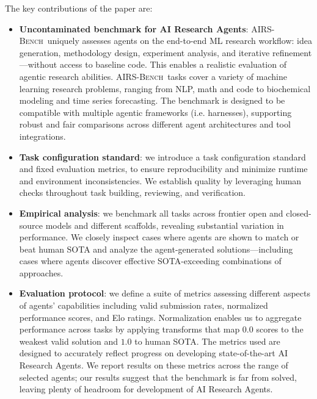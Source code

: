 \documentclass{fairmeta}
\newcommand{\airsbench}{\textsc{AIRS-Bench}}
\begin{document}
The key contributions of the paper are:
\begin{itemize}
    \item \textbf{Uncontaminated benchmark for AI Research Agents}: \airsbench~uniquely assesses agents on the end-to-end ML research workflow: idea generation, methodology design, experiment analysis, and iterative refinement---without access to baseline code. This enables a realistic evaluation of agentic research abilities. \airsbench~tasks cover a variety of machine learning research problems, ranging from NLP, math and code to biochemical modeling and time series forecasting. The benchmark is designed to be compatible with multiple agentic frameworks (i.e. harnesses), supporting robust and fair comparisons across different agent architectures and tool integrations.
    \item \textbf{Task configuration standard}: we introduce a task configuration standard and fixed evaluation metrics, to ensure reproducibility and minimize runtime and environment inconsistencies. We establish quality by leveraging human checks throughout task building, reviewing, and verification.
    \item \textbf{Empirical analysis}: we benchmark all tasks across frontier open and closed-source models  and different scaffolds, revealing substantial variation in performance. We closely inspect cases where agents are shown to match or beat human SOTA and analyze the agent-generated solutions---including cases where agents discover effective SOTA-exceeding combinations of approaches.
    \item \textbf{Evaluation protocol}: we define a suite of metrics assessing different aspects of agents' capabilities including valid submission rates, normalized performance scores, and Elo ratings. Normalization enables us to aggregate performance across tasks by applying transforms that map $0.0$ scores to the weakest valid solution and $1.0$ to human SOTA.  The metrics used are designed to accurately reflect progress on developing state-of-the-art AI Research Agents. We report results on these metrics across the range of selected agents; our results suggest that the benchmark is far from solved, leaving plenty of headroom for development of AI Research Agents.
\end{itemize}


\end{document}

